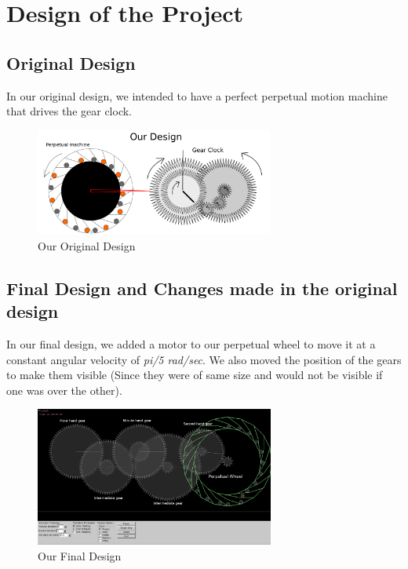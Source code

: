 \documentclass[10pt]{article} \usepackage[a4paper,left=0.8in,right=0.8in,top=0.4in,bottom=0.8in]{geometry} \usepackage{graphicx}
\begin{document}
\section{Design of the Project}
\subsection{Original Design}
In our original design\cite{vdo}, we intended to have a perfect perpetual motion machine\cite{wikiper} that drives the gear\cite{wikigr} clock\cite{wikicl}.

\begin{figure}[ht!]
\centering
\includegraphics[width=0.7\textwidth]{images/project.png}
\caption{Our Original Design}
\end{figure}

\subsection{Final Design and Changes made in the original design}
In our final design\cite{main}, we added a motor to our perpetual wheel to move it at a constant angular velocity of \textit{pi/5 rad/sec}. We also moved the position of the gears to make them visible (Since they were of same size and would not be visible if one was over the other).

\begin{figure}[ht!]
\centering
\includegraphics[width=0.7\textwidth]{images/final.png}
\caption{Our Final Design}
\end{figure}
\end{document}
